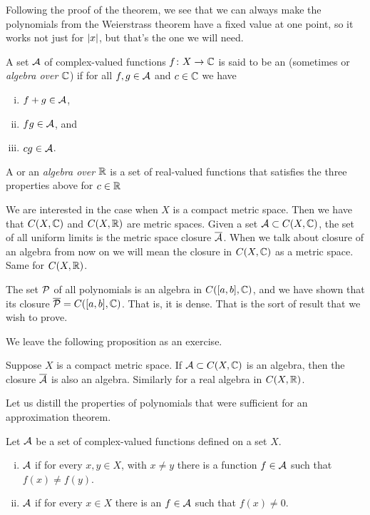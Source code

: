 Following the proof of the theorem,
we see that we can always make the polynomials from the Weierstrass theorem
have a fixed value at one point, so it works not just for $\lvert {x} \rvert$, but
that's the one we will need.

\begin{defn}
A set ${\mathcal{A}}$ of complex-valued functions $f \colon X \to {\mathbb{C}}$ is said to be an 
\emph{} (sometimes
\emph{} or \emph{algebra over ${\mathbb{C}}$}) if for all $f, g \in {\mathcal{A}}$ and $c \in {\mathbb{C}}$ we have
\begin{enumerate}[(i)]
\item $f+g \in {\mathcal{A}}$,
\item $fg \in {\mathcal{A}}$, and
\item $cg \in {\mathcal{A}}$.
\end{enumerate}
A \emph{} or an
\emph{algebra over ${\mathbb{R}}$} is a set of real-valued
functions that satisfies the three properties above for $c \in {\mathbb{R}}$
\end{defn}

We are interested in the case when
$X$ is a compact metric space.  Then
we have that $C(X,{\mathbb{C}})$ and $C(X,{\mathbb{R}})$ are metric spaces.
Given a set ${\mathcal{A}} \subset C(X,{\mathbb{C}})$, the set of all uniform
limits is the metric space closure $\overline{{\mathcal{A}}}$.
When we talk about closure of an algebra
from now on we will mean the closure in $C(X,{\mathbb{C}})$
as a metric space.  Same for $C(X,{\mathbb{R}})$.

The set ${\mathcal{P}}$ of all polynomials is an algebra in
$C([a,b],{\mathbb{C}})$, and we
have shown that its closure $\overline{{\mathcal{P}}} = C([a,b],{\mathbb{C}})$.
That is, it is dense.  That is the sort of result that we wish to prove.

We leave the following proposition as an exercise.

\begin{prop} \label{prop:closureofalgebra}
Suppose $X$ is a compact metric space.
If ${\mathcal{A}} \subset C(X,{\mathbb{C}})$ is an algebra, then the closure $\overline{{\mathcal{A}}}$ is also an algebra.
Similarly for a real algebra in $C(X,{\mathbb{R}})$.
\end{prop}

Let us distill the properties of polynomials that were sufficient
for an approximation theorem.

\begin{defn}
Let ${\mathcal{A}}$ be a set of complex-valued functions defined on a set $X$.
\begin{enumerate}[(i)]
\item ${\mathcal{A}}$ \emph{}
if for every $x,y \in X$, with $x \not= y$ there is a function $f \in {\mathcal{A}}$ such that
$f(x) \not= f(y)$.
\item 
${\mathcal{A}}$ \emph{} if for every $x \in X$
there is an $f \in {\mathcal{A}}$ such that $f(x) \not= 0$.
\end{enumerate}
\end{defn}

